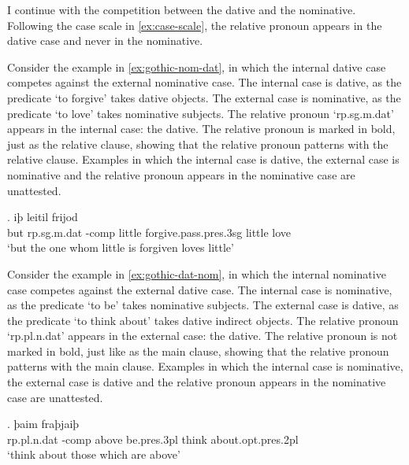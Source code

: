 I continue with the competition between the dative and the nominative. Following the case scale in \ref{ex:case-scale}, the relative pronoun appears in the dative case and never in the nominative.

Consider the example in \ref{ex:gothic-nom-dat}, in which the internal dative case competes against the external nominative case.
The internal case is dative, as the predicate  `to forgive' takes dative objects.
The external case is nominative, as the predicate  `to love' takes nominative subjects.
The relative pronoun  `\ac{rp}.\ac{sg}.\ac{m}.\ac{dat}' appears in the internal case: the dative. The relative pronoun is marked in bold, just as the relative clause, showing that the relative pronoun patterns with the relative clause.
Examples in which the internal case is dative, the external case is nominative and the relative pronoun appears in the nominative case are unattested.

\exg. iþ     leitil frijod\\
 but \ac{rp}.\ac{sg}.\ac{m}.\ac{dat} -\ac{comp} little {forgive}.\ac{pass}.\ac{pres}.3\ac{sg}\scsub{[dat]} little love\scsub{[nom]}\\
 `but the one whom little is forgiven loves little' \label{ex:gothic-nom-dat}

Consider the example in \ref{ex:gothic-dat-nom}, in which the internal nominative case competes against the external dative case.
The internal case is nominative, as the predicate  `to be' takes nominative subjects.
The external case is dative, as the predicate  `to think about' takes dative indirect objects.
The relative pronoun  `\ac{rp}.\ac{pl}.\ac{n}.\ac{dat}' appears in the external case: the dative. The relative pronoun is not marked in bold, just like as the main clause, showing that the relative pronoun patterns with the main clause.
Examples in which the internal case is nominative, the external case is dative and the relative pronoun appears in the nominative case are unattested.

\exg. þaim    fraþjaiþ \\
 \ac{rp}.\ac{pl}.\ac{n}.\ac{dat} -\ac{comp} above be.\ac{pres}.3\ac{pl}\scsub{[nom]} {think about}.\ac{opt}.\ac{pres}.2\ac{pl}\scsub{[dat]}\\
 `think about those which are above' \label{ex:gothic-dat-nom}

